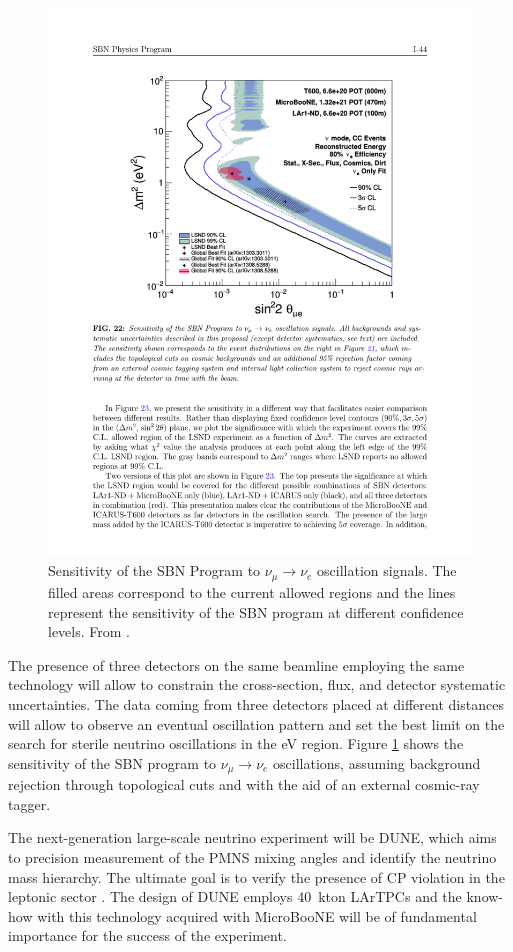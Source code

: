 \begin{figure}[htbp]
    \centering
    \includegraphics[width=0.75\linewidth]{figures/sbn_sensitivity.pdf}
    \caption{Sensitivity of the SBN Program to $\nu_{\mu}\rightarrow\nu_e$ oscillation signals. The filled areas correspond to the current allowed regions and the lines represent the sensitivity of the SBN program at different confidence levels. From \cite{Antonello:2015lea}.}
    \label{fig:sbn_sensitivity}
\end{figure}

The presence of three detectors on the same beamline employing the same technology will allow to constrain the cross-section, flux, and detector systematic uncertainties. The data coming from three detectors placed at different distances will allow to observe an eventual oscillation pattern and set the best limit on the search for sterile neutrino oscillations in the eV region. Figure \ref{fig:sbn_sensitivity} shows the sensitivity of the SBN program to $\nu_{\mu}\rightarrow\nu_e$ oscillations, assuming background rejection through topological cuts and with the aid of an external cosmic-ray tagger. 

The next-generation large-scale neutrino experiment will be DUNE, which aims to precision measurement of the PMNS mixing angles and identify the neutrino mass hierarchy. The ultimate goal is to verify the presence of CP violation in the leptonic sector \cite{Acciarri:2015uup}. The design of DUNE employs 40~kton LArTPCs and the know-how with this technology acquired with MicroBooNE will be of fundamental importance for the success of the experiment.
